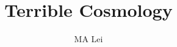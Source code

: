 \documentclass[11pt]{book}
\begin{document}
\title{Terrible Cosmology}
\author{MA Lei}
\maketitle



\frontmatter
\tableofcontents





\mainmatter















\backmatter
\end{document}
